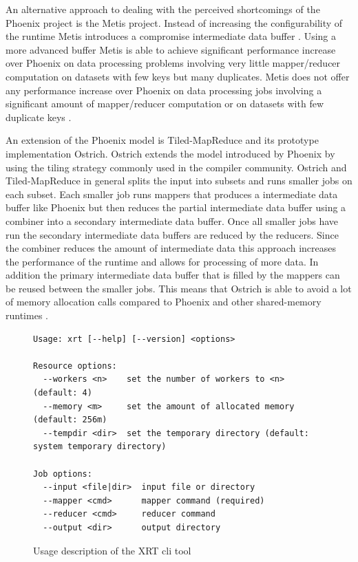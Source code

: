 \documentclass[twocolumn,11px]{article}       %
\begin{document}
An alternative approach to dealing with the perceived shortcomings of the
Phoenix project is the Metis project. Instead of increasing the configurability
of the runtime Metis introduces a compromise intermediate data buffer
\cite{Metis}. Using a more advanced buffer Metis is able to achieve significant
performance increase over Phoenix on data processing problems involving very
little mapper/reducer computation on datasets with few keys but many duplicates.
Metis does not offer any performance increase over Phoenix on data processing
jobs involving a significant amount of mapper/reducer computation or on datasets
with few duplicate keys \cite{Metis}.

An extension of the Phoenix model is Tiled-MapReduce and its prototype
implementation Ostrich. Ostrich extends the model introduced by Phoenix by using
the tiling strategy commonly used in the compiler community. Ostrich and
Tiled-MapReduce in general splits the input into subsets and runs smaller jobs on each
subset. Each smaller job runs mappers that produces a intermediate data buffer
like Phoenix but then reduces the partial intermediate data buffer using a
combiner into a secondary intermediate data buffer. Once all smaller jobs have
run the secondary intermediate data buffers are reduced by the reducers. Since
the combiner reduces the amount of intermediate data this approach increases the
performance of the runtime and allows for processing of more data. In addition
the primary intermediate data buffer that is filled by the mappers can be reused
between the smaller jobs. This means that Ostrich is able to avoid a lot of
memory allocation calls compared to Phoenix and other shared-memory runtimes
\cite{Ostrich}.

\begin{figure}[h]
\begin{lstlisting}
Usage: xrt [--help] [--version] <options>

Resource options:
  --workers <n>    set the number of workers to <n> (default: 4)
  --memory <m>     set the amount of allocated memory (default: 256m)
  --tempdir <dir>  set the temporary directory (default: system temporary directory)

Job options:
  --input <file|dir>  input file or directory
  --mapper <cmd>      mapper command (required)
  --reducer <cmd>     reducer command
  --output <dir>      output directory
\end{lstlisting}
\caption{Usage description of the XRT cli tool}
\label{fig:xrt}
\end{figure}
\end{document}
